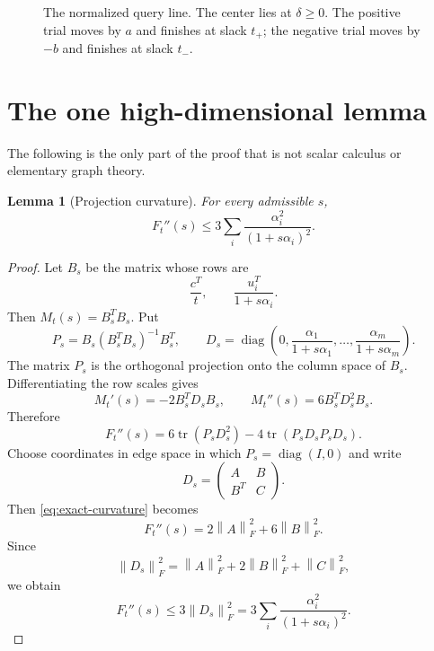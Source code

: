 \documentclass[11pt]{article}
\newtheorem{lemma}[theorem]{Lemma}
\theoremstyle{definition}
\newcommand{\tr}{\operatorname{tr}}
\newcommand{\1}{\mathbf{1}}
\newcommand{\norm}[1]{\left\lVert #1\right\rVert}
\begin{document}
\begin{figure}[t]
\centering
{}
\caption{The normalized query line.  The center lies at $\delta\ge0$.  The positive trial moves by $a$ and finishes at slack $t_+$; the negative trial moves by $-b$ and finishes at slack $t_-$.}
\label{fig:query-line}
\end{figure}

\section{The one high-dimensional lemma}

The following is the only part of the proof that is not scalar calculus or elementary graph theory.

\begin{lemma}[Projection curvature]
For every admissible $s$,
\begin{equation}
F_t''(s)\le3\sum_i\frac{\alpha_i^2}{(1+s\alpha_i)^2}.
\label{eq:curvature-bound}
\end{equation}
\end{lemma}

\begin{proof}
Let $B_s$ be the matrix whose rows are
\[
\frac{c^T}{t},
\qquad
\frac{u_i^T}{1+s\alpha_i}.
\]
Then $M_t(s)=B_s^TB_s$.  Put
\[
P_s=B_s(B_s^TB_s)^{-1}B_s^T,
\qquad
D_s=\operatorname{diag}\left(0,
\frac{\alpha_1}{1+s\alpha_1},\ldots,
\frac{\alpha_m}{1+s\alpha_m}\right).
\]
The matrix $P_s$ is the orthogonal projection onto the column space of $B_s$.  Differentiating the row scales gives
\[
M_t'(s)=-2B_s^TD_sB_s,
\qquad
M_t''(s)=6B_s^TD_s^2B_s.
\]
Therefore
\begin{equation}
F_t''(s)=6\tr(P_sD_s^2)-4\tr(P_sD_sP_sD_s).
\label{eq:exact-curvature}
\end{equation}
Choose coordinates in edge space in which $P_s=\operatorname{diag}(I,0)$ and write
\[
D_s=\begin{pmatrix}A&B\\B^T&C\end{pmatrix}.
\]
Then \eqref{eq:exact-curvature} becomes
\[
F_t''(s)=2\norm{A}_F^2+6\norm{B}_F^2.
\]
Since
\[
\norm{D_s}_F^2=\norm{A}_F^2+2\norm{B}_F^2+\norm{C}_F^2,
\]
we obtain
\[
F_t''(s)\le3\norm{D_s}_F^2
=3\sum_i\frac{\alpha_i^2}{(1+s\alpha_i)^2}.
\]
\end{proof}
\end{document}
